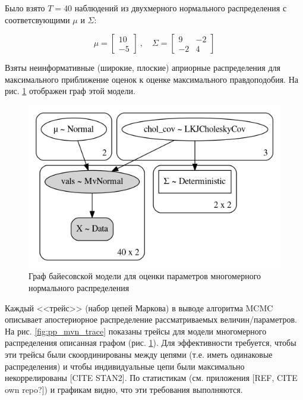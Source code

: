 \documentclass[a4paper,14pt]{extreport}
\begin{document}
Было взято $T=40$ наблюдений из двухмерного нормального распределения с соответсвующими $\mu$ и $\Sigma$:

\begin{equation}
	\mu = 
	\begin{bmatrix}
		10 \\
		-5
	\end{bmatrix}
	\	, \quad
	\Sigma = 
	\begin{bmatrix} 
		9  & -2 \\
		-2 & 4 
	\end{bmatrix}
\end{equation}

Взяты неинформативные (широкие, плоские) априорные распределения для максимального приближение оценок к оценке максимального правдоподобия. На рис. \ref{fig:pp_mvn_graph} отображен граф этой модели.

\begin{figure}[H]
	\includegraphics[width=\linewidth]{img/gen/pp_mvn_graph.png}
	\caption{Граф байесовской модели для оценки параметров многомерного нормального распределения}
	\label{fig:pp_mvn_graph}
\end{figure}

Каждый <<трейс>> (набор цепей Маркова) в выводе алгоритма MCMC описывает апостериорное распределение рассматриваемых величин/параметров. На рис. \ref{fig:pp_mvn_trace} показаны трейсы для модели многомерного распределения описанная графом (рис. \ref{fig:pp_mvn_graph}). Для эффективности требуется, чтобы эти трейсы были скоординированы между цепями (т.е. иметь одинаковые распределения) и чтобы индивидуальные цепи были максимально некоррелированы [CITE STAN2]. По статистикам (см. приложения [REF, CITE own repo?]) и графикам видно, что эти требования выполняются.
\end{document}
